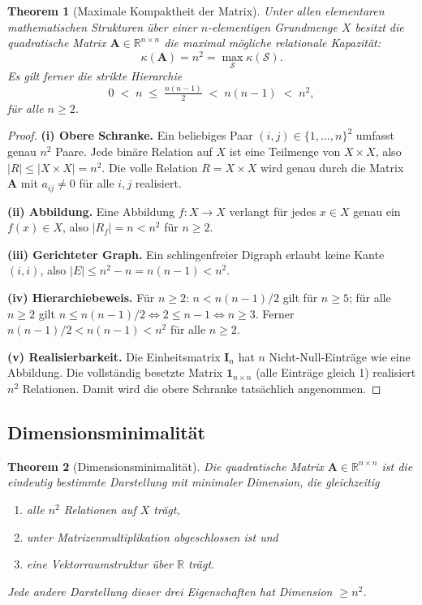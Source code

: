 ﻿\documentclass[12pt, a4paper]{article}
\newtheorem{theorem}{Theorem}[section]
\theoremstyle{definition}
\theoremstyle{remark}
\newcommand{\R}{\mathbb{R}}
\newcommand{\vA}{\bm{A}}
\newcommand{\vI}{\bm{I}}
\begin{document}
\begin{theorem}[Maximale Kompaktheit der Matrix]
\label{thm:maxkompakt}
Unter allen elementaren mathematischen Strukturen über einer
$n$-elementigen Grundmenge $X$ besitzt die quadratische Matrix
$\vA \in \R^{n \times n}$ die maximal mögliche relationale Kapazität:
\[
  \kappa(\vA) = n^2 = \max_{\mathcal{S}} \kappa(\mathcal{S}).
\]
Es gilt ferner die strikte Hierarchie
\[
  0 \;<\; n \;\leq\; \tfrac{n(n-1)}{2} \;<\; n(n-1) \;<\; n^2,
\]
für alle $n \geq 2$.
\end{theorem}

\begin{proof}
\textbf{(i) Obere Schranke.}
Ein beliebiges Paar $(i,j) \in \{1,\ldots,n\}^2$ umfasst genau $n^2$
Paare. Jede binäre Relation auf $X$ ist eine Teilmenge von $X \times X$,
also $|R| \leq |X \times X| = n^2$. Die volle Relation
$R = X \times X$ wird genau durch die Matrix $\vA$ mit $a_{ij} \neq 0$
für alle $i,j$ realisiert.

\textbf{(ii) Abbildung.}
Eine Abbildung $f: X \to X$ verlangt für jedes $x \in X$ genau ein
$f(x) \in X$, also $|R_f| = n < n^2$ für $n \geq 2$.

\textbf{(iii) Gerichteter Graph.}
Ein schlingenfreier Digraph erlaubt keine Kante $(i,i)$, also
$|E| \leq n^2 - n = n(n-1) < n^2$.

\textbf{(iv) Hierarchiebeweis.}
Für $n \geq 2$: $n < n(n-1)/2$ gilt für $n \geq 5$; für alle $n \geq 2$
gilt $n \leq n(n-1)/2 \Leftrightarrow 2 \leq n-1 \Leftrightarrow n \geq 3$.
Ferner $n(n-1)/2 < n(n-1) < n^2$ für alle $n \geq 2$.

\textbf{(v) Realisierbarkeit.}
Die Einheitsmatrix $\vI_n$ hat $n$ Nicht-Null-Einträge wie eine
Abbildung. Die vollständig besetzte Matrix $\mathbf{1}_{n \times n}$
(alle Einträge gleich 1) realisiert $n^2$ Relationen. Damit wird die
obere Schranke tatsächlich angenommen.
\end{proof}

\subsection{Dimensionsminimalität}
\label{subsec:minimal}

\begin{theorem}[Dimensionsminimalität]
\label{thm:dimmin}
Die quadratische Matrix $\vA \in \R^{n \times n}$ ist die eindeutig
bestimmte Darstellung mit minimaler Dimension, die gleichzeitig
\begin{enumerate}[label=(\roman*)]
  \item alle $n^2$ Relationen auf $X$ trägt,
  \item unter Matrizenmultiplikation abgeschlossen ist und
  \item eine Vektorraumstruktur über $\R$ trägt.
\end{enumerate}
Jede andere Darstellung dieser drei Eigenschaften hat Dimension
$\geq n^2$.
\end{theorem}
\end{document}
